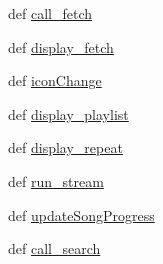 \begin{DoxyCompactItemize}
def \hyperlink{classrunIG_1_1MyForm_a794e6729cad24f4486828816721f16a2}{call\_\-fetch}
\item 
def \hyperlink{classrunIG_1_1MyForm_a5de2202410cfca52abe1e93c9c6c708d}{display\_\-fetch}
\item 
def \hyperlink{classrunIG_1_1MyForm_aadeafc761a0a026d15d154c83c7d70e0}{iconChange}
\item 
def \hyperlink{classrunIG_1_1MyForm_aadbb1c487cb63d3418fb56b60e410a0b}{display\_\-playlist}
\item 
def \hyperlink{classrunIG_1_1MyForm_a9595e8e9ee2cc30f09aa521755ac2a75}{display\_\-repeat}
\item 
def \hyperlink{classrunIG_1_1MyForm_a7da6aa84ed975dca302d6a40ff5cbf45}{run\_\-stream}
\item 
def \hyperlink{classrunIG_1_1MyForm_a14301e0ee42c81f5f9bc5d22f30e54b5}{updateSongProgress}
\item 
def \hyperlink{classrunIG_1_1MyForm_a724ad1c6a447aa00dd6e3c5c8d098a1c}{call\_\-search}
\end{DoxyCompactItemize}
